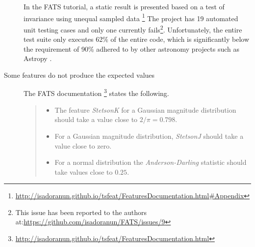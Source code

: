 \documentclass[final,5p,times,twocolumn,authoryear]{elsarticle}
\begin{document}
\begin{description}
In the FATS tutorial, a static result is 
presented based on a test of invariance using 
unequal sampled data 
\footnote{\url{http://isadoranun.github.io/tsfeat/FeaturesDocumentation.html\#Appendix}}
%
The project has 19 automated unit testing cases and only one currently
fails\footnote{This issue has been reported to the authors 
at:\url{https://github.com/isadoranun/FATS/issues/9}}.
%
Unfortunately, the entire test suite only executes 62\% of the entire code, which is 
significantly below the requirement of 90\% adhered to by other astronomy projects such as 
Astropy \citep{robitaille_astropy:_2013}.

\item [Some features do not produce the expected values]
%
The FATS documentation \footnote{\url{http://isadoranun.github.io/tsfeat/FeaturesDocumentation.html}} states the following.
\begin{quote}
\begin{itemize}
  \item The feature \textit{StetsonK} for a Gaussian magnitude 
  distribution should take a value close to $2/\pi=0.798$.
  \item For a Gaussian magnitude distribution, \textit{StetsonJ} 
  should take a value close to zero.
  \item For a normal distribution the \textit{Anderson-Darling} 
  statistic should take values close to $0.25$.
\end{itemize}
\end{quote}


\end{description}
\end{document}
